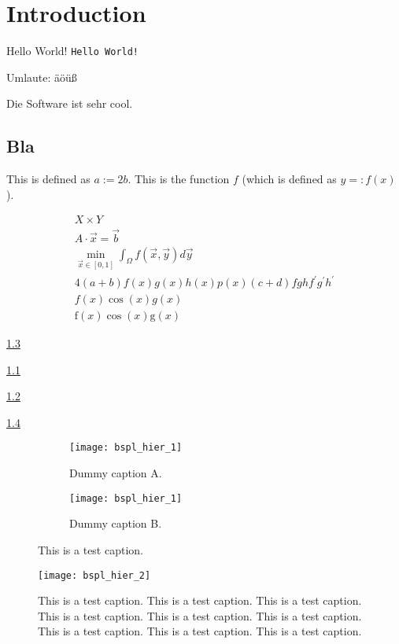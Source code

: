 
\chapter{Introduction}

\cite{zenger91sparse}

Hello World! \texttt{Hello World!}

Umlaute: äöüß

Die Software \sgpp ist sehr cool.

\section{Bla}

This is defined as $a := 2b$.
This is the function $f$ (which is defined as $y =: f(x)$).

\begin{gather}
  X \times Y\\
  A \cdot \vec{x} = \vec{b}\\
  \min_{\vec{x} \in [0, 1]} \int_\Omega f(\vec{x}, \vec{y}) d\vec{y}\\
  4(a+b)f(x)g(x)h(x)p(x)(c+d)fghf^\prime g^\prime h^\prime\\
  f(x)\cos(x)g(x)\\
  \mathrm{f}(x)\cos(x)\mathrm{g}(x)
\end{gather}

\cref{fig:1}

\cref{fig:1a}

\cref{fig:1b}

\cref{fig:2}

\begin{figure}
  \begin{subfigure}{60mm}
    \texttt{[image: bspl\_hier\_1]}
    \caption{Dummy caption A.}
    \label{fig:1a}
  \end{subfigure}
  \begin{subfigure}{60mm}
    \texttt{[image: bspl\_hier\_1]}
    \caption{Dummy caption B.}
    \label{fig:1b}
  \end{subfigure}
  \caption{This is a test caption.}
  \label{fig:1}
\end{figure}

\begin{figure}
  \texttt{[image: bspl\_hier\_2]}
  \caption{%
    This is a test caption.
    This is a test caption.
    This is a test caption.
    This is a test caption.
    This is a test caption.
    This is a test caption.
    This is a test caption.
    This is a test caption.
    This is a test caption.%
  }
  \label{fig:2}
\end{figure}

\blindmathpaper

